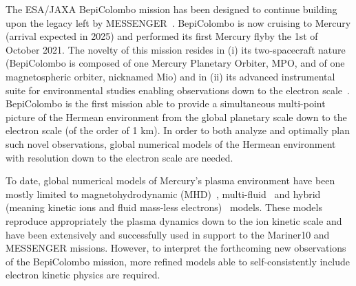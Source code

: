 \documentclass{aa}
\begin{document}
The ESA/JAXA BepiColombo mission has been designed to continue building upon the legacy left by MESSENGER~\citep{Benkhoff2021}.
BepiColombo is now cruising to Mercury (arrival expected in 2025) and performed its first Mercury flyby the 1st of October 2021. The novelty of this mission resides in (i) its two-spacecraft nature (BepiColombo is composed of one Mercury Planetary Orbiter, MPO, and of one magnetospheric orbiter, nicknamed Mio) and in (ii) its advanced instrumental suite for environmental studies enabling observations down to the electron scale~\citep{Milillo2020}. BepiColombo is the first mission able to provide a simultaneous multi-point picture of the Hermean environment from the global planetary scale down to the electron scale (of the order of 1 km). In order to both analyze and optimally plan such novel observations, global numerical models of the Hermean environment with resolution down to the electron scale are needed.

To date, global numerical models of Mercury's plasma environment have been mostly limited to magnetohydrodynamic (MHD)~\citep{Kabin2000,Ip2002,Yagi2010,Pantellini2015,Jia2015,Jia2019}, multi-fluid~\citep{Kidder2008,Benna2010,Dong2019} and hybrid (meaning kinetic ions and fluid mass-less electrons)~\citep{Kallio2003,Travnicek2007,Travnicek2009,Travnicek2010,Richer2012,Muller2012,Hercik2013,Hercik2016,Fatemi2018,Fatemi2020,Exner2018,Exner2020} models. These models reproduce appropriately the plasma dynamics down to the ion kinetic scale and have been extensively and successfully used in support to the Mariner10 and MESSENGER missions. However, to interpret the forthcoming new observations of the BepiColombo mission, more refined models able to self-consistently include electron kinetic physics are required.
\end{document}
